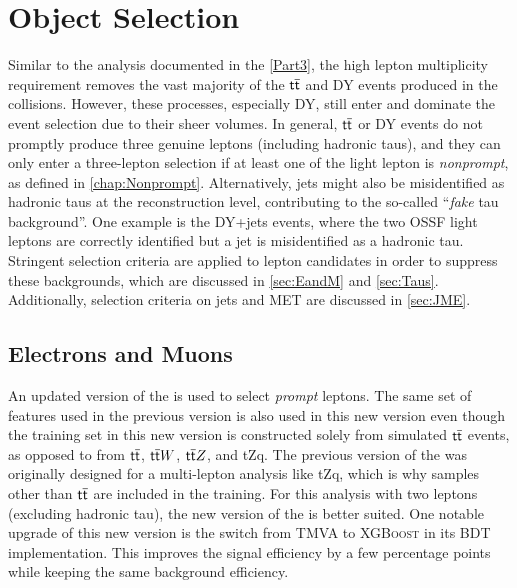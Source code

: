\chapter{Object Selection}
\label{chap:Obj}

Similar to the analysis documented in the \autoref{Part3}, the high lepton multiplicity requirement removes the vast majority of the $\textsf{t}\overline{\textsf{t}}$ and \ac{DY} events produced in the collisions. However, these processes, especially \ac{DY}, still enter and dominate the event selection due to their sheer volumes. In general, $\textsf{t}\overline{\textsf{t}}$ or \ac{DY} events do not promptly produce three genuine leptons (including hadronic taus), and they can only enter a three-lepton selection if at least one of the light lepton is \emph{nonprompt}, as defined in \autoref{chap:Nonprompt}. Alternatively, jets might also be misidentified as hadronic taus at the reconstruction level, contributing to the so-called ``\emph{fake} tau background''. One example is the \ac{DY}+jets events, where the two \ac{OSSF} light leptons are correctly identified but a jet is misidentified as a hadronic tau. Stringent selection criteria are applied to lepton candidates in order to suppress these backgrounds, which are discussed in \autoref{sec:EandM} and \autoref{sec:Taus}. Additionally, selection criteria on jets and \ac{MET} are discussed in \autoref{sec:JME}.

\section{Electrons and Muons}
\label{sec:EandM}

An updated version of the \TOP\cite{CMS:2023ftu} is used to select \emph{prompt} leptons. The same set of features used in the previous version is also used in this new version even though the training set in this new version is constructed solely from simulated $\textsf{t}\overline{\textsf{t}}$ events, as opposed to from $\textsf{t}\overline{\textsf{t}}$, $\textsf{t}\overline{\textsf{t}} W$, $\textsf{t}\overline{\textsf{t}} Z$, and tZq. The previous version of the \TOP was originally designed for a multi-lepton analysis like tZq, which is why samples other than $\textsf{t}\overline{\textsf{t}}$ are included in the training. For this analysis with two leptons (excluding hadronic tau), the new version of the \TOP is better suited. One notable upgrade of this new version is the switch from TMVA \cite{TMVA:2007ngy} to \textsc{XGBoost} \cite{Chen:2016:XST:2939672.2939785} in its \ac{BDT} implementation. This improves the signal efficiency by a few percentage points while keeping the same background efficiency. 

